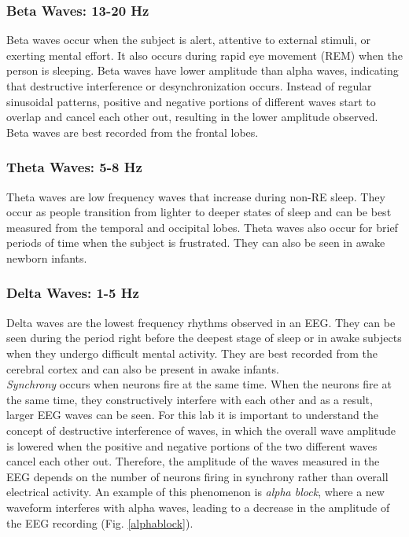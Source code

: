 \documentclass{article}
\begin{document}
\subsubsection*{Beta Waves: 13-20 Hz}
Beta waves occur when the subject is alert, attentive to external stimuli, or exerting mental effort. It also occurs during rapid eye movement (REM) when the person is sleeping. Beta waves have lower amplitude than alpha waves, indicating that destructive interference or desynchronization occurs. Instead of regular sinusoidal patterns, positive and negative portions of different waves start to overlap and cancel each other out, resulting in the lower amplitude observed. Beta waves are best recorded from the frontal lobes.

\subsubsection*{Theta Waves: 5-8 Hz}
Theta waves are low frequency waves that increase during non-RE sleep. They occur as people transition from lighter to deeper states of sleep and can be best measured from the temporal and occipital lobes. Theta waves also occur for brief periods of time when the subject is frustrated. They can also be seen in awake newborn infants.

\subsubsection*{Delta Waves: 1-5 Hz}
Delta waves are the lowest frequency rhythms observed in an EEG. They can be seen during the period right before the deepest stage of sleep or in awake subjects when they undergo difficult mental activity. They are best recorded from the cerebral cortex and can also be present in awake infants.\\

\textit{Synchrony} occurs when neurons fire at the same time. When the neurons fire at the same time, they constructively interfere with each other and as a result, larger EEG waves can be seen. For this lab it is important to understand the concept of destructive interference of waves, in which the overall wave amplitude is lowered when the positive and negative portions of the two different waves cancel each other out. Therefore, the amplitude of the waves measured in the EEG depends on the number of neurons firing in synchrony rather than overall electrical activity. An example of this phenomenon is \textit{alpha block}, where a new waveform interferes with alpha waves, leading to a decrease in the amplitude of the EEG recording (Fig. \ref{alphablock}).
\end{document}
